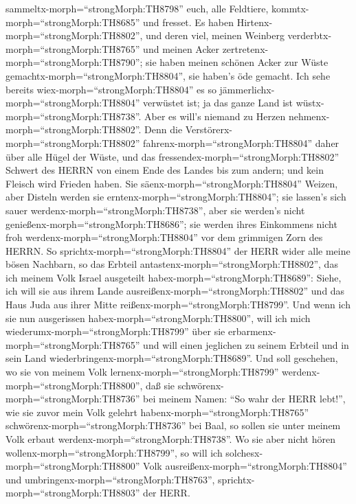 sammeltx-morph=``strongMorph:TH8798'' euch, alle Feldtiere,
kommtx-morph=``strongMorph:TH8685'' und fresset.  Es haben
Hirtenx-morph=``strongMorph:TH8802'', und deren viel, meinen Weinberg
verderbtx-morph=``strongMorph:TH8765'' und meinen Acker
zertretenx-morph=``strongMorph:TH8790''; sie haben meinen schönen Acker
zur Wüste gemachtx-morph=``strongMorph:TH8804'', sie haben's öde
gemacht.  Ich sehe bereits
wiex-morph=``strongMorph:TH8804'' es so
jämmerlichx-morph=``strongMorph:TH8804'' verwüstet ist; ja das ganze
Land ist wüstx-morph=``strongMorph:TH8738''. Aber es will's niemand zu
Herzen nehmenx-morph=``strongMorph:TH8802''.  Denn die
Verstörerx-morph=``strongMorph:TH8802''
fahrenx-morph=``strongMorph:TH8804'' daher über alle Hügel der Wüste,
und das fressendex-morph=``strongMorph:TH8802'' Schwert des HERRN von
einem Ende des Landes bis zum andern; und kein Fleisch wird Frieden
haben.  Sie säenx-morph=``strongMorph:TH8804'' Weizen, aber
Disteln werden sie erntenx-morph=``strongMorph:TH8804''; sie lassen's
sich sauer werdenx-morph=``strongMorph:TH8738'', aber sie werden's nicht
genießenx-morph=``strongMorph:TH8686''; sie werden ihres Einkommens
nicht froh werdenx-morph=``strongMorph:TH8804'' vor dem grimmigen Zorn
des HERRN.  So sprichtx-morph=``strongMorph:TH8804'' der
HERR wider alle meine bösen Nachbarn, so das Erbteil
antastenx-morph=``strongMorph:TH8802'', das ich meinem Volk Israel
ausgeteilt habex-morph=``strongMorph:TH8689'': Siehe, ich will sie aus
ihrem Lande ausreißenx-morph=``strongMorph:TH8802'' und das Haus Juda
aus ihrer Mitte reißenx-morph=``strongMorph:TH8799''.  Und
wenn ich sie nun ausgerissen habex-morph=``strongMorph:TH8800'', will
ich mich wiederumx-morph=``strongMorph:TH8799'' über sie
erbarmenx-morph=``strongMorph:TH8765'' und will einen jeglichen zu
seinem Erbteil und in sein Land
wiederbringenx-morph=``strongMorph:TH8689''.  Und soll
geschehen, wo sie von meinem Volk lernenx-morph=``strongMorph:TH8799''
werdenx-morph=``strongMorph:TH8800'', daß sie
schwörenx-morph=``strongMorph:TH8736'' bei meinem Namen: ``So wahr der
HERR lebt!'', wie sie zuvor mein Volk gelehrt
habenx-morph=``strongMorph:TH8765''
schwörenx-morph=``strongMorph:TH8736'' bei Baal, so sollen sie unter
meinem Volk erbaut werdenx-morph=``strongMorph:TH8738''. 
Wo sie aber nicht hören wollenx-morph=``strongMorph:TH8799'', so will
ich solchesx-morph=``strongMorph:TH8800'' Volk
ausreißenx-morph=``strongMorph:TH8804'' und
umbringenx-morph=``strongMorph:TH8763'',
sprichtx-morph=``strongMorph:TH8803'' der HERR.

